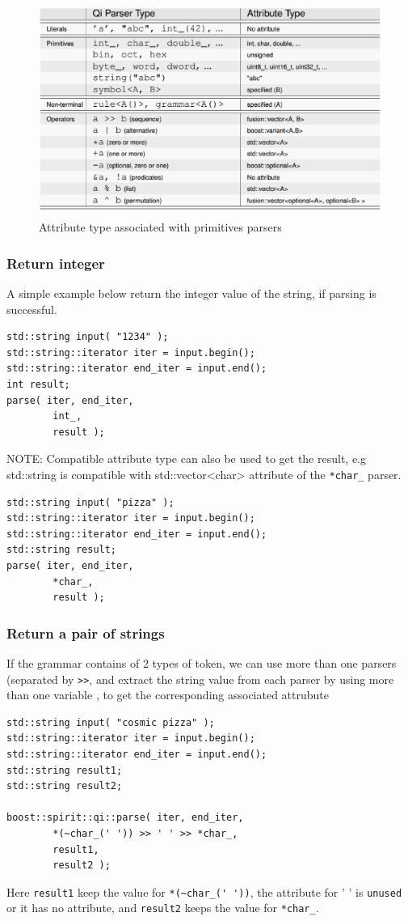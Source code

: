 \begin{figure}[hbt]
  \centerline{\includegraphics[height=7cm,
    angle=0]{./images/Boost_Spirit_attribute-type.eps}}
\caption{Attribute type associated with primitives parsers}
\label{fig:boost_spirit_qi_attribute-type}
\end{figure}

\subsubsection{Return integer}
 
A simple example below return the integer value of the string, if parsing is
successful.
\begin{verbatim}
std::string input( "1234" );
std::string::iterator iter = input.begin();
std::string::iterator end_iter = input.end();
int result;
parse( iter, end_iter,
        int_,
        result );
\end{verbatim}

NOTE: Compatible attribute type can also be used to get the result, e.g
std::string is compatible with std::vector<char>
attribute of the \verb!*char_! parser.
\begin{verbatim}
std::string input( "pizza" );
std::string::iterator iter = input.begin();
std::string::iterator end_iter = input.end();
std::string result;
parse( iter, end_iter,
		*char_,
		result );
\end{verbatim}

\subsubsection{Return a pair of strings}

If the grammar contains of 2 types of token, we can use more than one parsers
(separated by \verb!>>!, and extract the string value from each parser by using
more than one variable , to get the corresponding associated attrubute
\begin{verbatim}
std::string input( "cosmic pizza" );
std::string::iterator iter = input.begin();
std::string::iterator end_iter = input.end();
std::string result1;
std::string result2;

boost::spirit::qi::parse( iter, end_iter,
		*(~char_(' ')) >> ' ' >> *char_,
		result1,
		result2 );
\end{verbatim}
Here \verb!result1! keep the value for \verb!*(~char_(' '))!, the attribute for
' ' is \verb!unused! or it has no attribute, and \verb!result2! keeps the value
for \verb!*char_!. 

